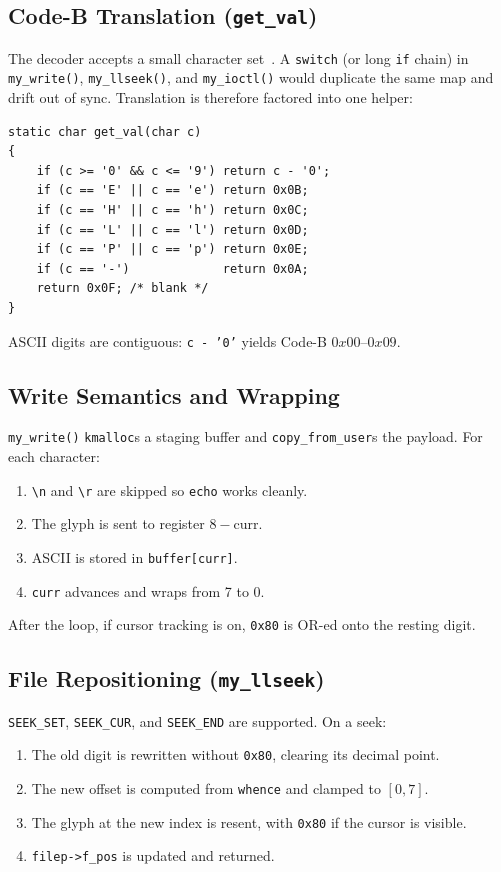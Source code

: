 \documentclass[conference,a4paper]{IEEEtran}
\begin{document}
\subsection{Code-B Translation (\texttt{get\_val})}

The decoder accepts a small character set~\cite{max7219}. A \texttt{switch} (or long \texttt{if} chain) in \texttt{my\_write()}, \texttt{my\_llseek()}, and \texttt{my\_ioctl()} would duplicate the same map and drift out of sync. Translation is therefore factored into one helper:
\begin{lstlisting}
static char get_val(char c)
{
    if (c >= '0' && c <= '9') return c - '0';
    if (c == 'E' || c == 'e') return 0x0B;
    if (c == 'H' || c == 'h') return 0x0C;
    if (c == 'L' || c == 'l') return 0x0D;
    if (c == 'P' || c == 'p') return 0x0E;
    if (c == '-')             return 0x0A;
    return 0x0F; /* blank */
}
\end{lstlisting}
ASCII digits are contiguous: \texttt{c - '0'} yields Code-B $0x00$--$0x09$.

\subsection{Write Semantics and Wrapping}

\texttt{my\_write()} \texttt{kmalloc}s a staging buffer and \texttt{copy\_from\_user}s the payload. For each character:
\begin{enumerate}
    \item \texttt{\textbackslash n} and \texttt{\textbackslash r} are skipped so \texttt{echo} works cleanly.
    \item The glyph is sent to register $8-\mathrm{curr}$.
    \item ASCII is stored in \texttt{buffer[curr]}.
    \item \texttt{curr} advances and wraps from 7 to 0.
\end{enumerate}
After the loop, if cursor tracking is on, \texttt{0x80} is OR-ed onto the resting digit.

\subsection{File Repositioning (\texttt{my\_llseek})}

\texttt{SEEK\_SET}, \texttt{SEEK\_CUR}, and \texttt{SEEK\_END} are supported. On a seek:
\begin{enumerate}
    \item The old digit is rewritten without \texttt{0x80}, clearing its decimal point.
    \item The new offset is computed from \texttt{whence} and clamped to $[0,7]$.
    \item The glyph at the new index is resent, with \texttt{0x80} if the cursor is visible.
    \item \texttt{filep->f\_pos} is updated and returned.
\end{enumerate}
\end{document}
